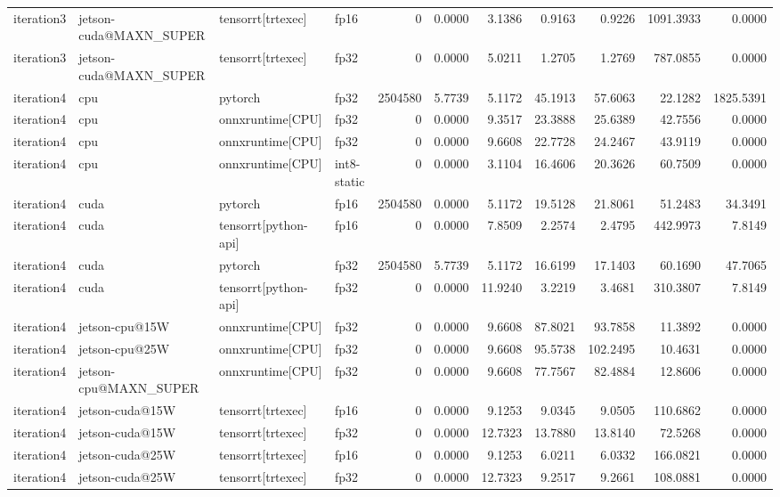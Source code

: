 \begin{table}
\begin{tabular}{llllrrrrrrr}
iteration3 & jetson-cuda@MAXN\_SUPER & tensorrt[trtexec] & fp16 & 0 & 0.0000 & 3.1386 & 0.9163 & 0.9226 & 1091.3933 & 0.0000 \\
iteration3 & jetson-cuda@MAXN\_SUPER & tensorrt[trtexec] & fp32 & 0 & 0.0000 & 5.0211 & 1.2705 & 1.2769 & 787.0855 & 0.0000 \\
iteration4 & cpu & pytorch & fp32 & 2504580 & 5.7739 & 5.1172 & 45.1913 & 57.6063 & 22.1282 & 1825.5391 \\
iteration4 & cpu & onnxruntime[CPU] & fp32 & 0 & 0.0000 & 9.3517 & 23.3888 & 25.6389 & 42.7556 & 0.0000 \\
iteration4 & cpu & onnxruntime[CPU] & fp32 & 0 & 0.0000 & 9.6608 & 22.7728 & 24.2467 & 43.9119 & 0.0000 \\
iteration4 & cpu & onnxruntime[CPU] & int8-static & 0 & 0.0000 & 3.1104 & 16.4606 & 20.3626 & 60.7509 & 0.0000 \\
iteration4 & cuda & pytorch & fp16 & 2504580 & 0.0000 & 5.1172 & 19.5128 & 21.8061 & 51.2483 & 34.3491 \\
iteration4 & cuda & tensorrt[python-api] & fp16 & 0 & 0.0000 & 7.8509 & 2.2574 & 2.4795 & 442.9973 & 7.8149 \\
iteration4 & cuda & pytorch & fp32 & 2504580 & 5.7739 & 5.1172 & 16.6199 & 17.1403 & 60.1690 & 47.7065 \\
iteration4 & cuda & tensorrt[python-api] & fp32 & 0 & 0.0000 & 11.9240 & 3.2219 & 3.4681 & 310.3807 & 7.8149 \\
iteration4 & jetson-cpu@15W & onnxruntime[CPU] & fp32 & 0 & 0.0000 & 9.6608 & 87.8021 & 93.7858 & 11.3892 & 0.0000 \\
iteration4 & jetson-cpu@25W & onnxruntime[CPU] & fp32 & 0 & 0.0000 & 9.6608 & 95.5738 & 102.2495 & 10.4631 & 0.0000 \\
iteration4 & jetson-cpu@MAXN\_SUPER & onnxruntime[CPU] & fp32 & 0 & 0.0000 & 9.6608 & 77.7567 & 82.4884 & 12.8606 & 0.0000 \\
iteration4 & jetson-cuda@15W & tensorrt[trtexec] & fp16 & 0 & 0.0000 & 9.1253 & 9.0345 & 9.0505 & 110.6862 & 0.0000 \\
iteration4 & jetson-cuda@15W & tensorrt[trtexec] & fp32 & 0 & 0.0000 & 12.7323 & 13.7880 & 13.8140 & 72.5268 & 0.0000 \\
iteration4 & jetson-cuda@25W & tensorrt[trtexec] & fp16 & 0 & 0.0000 & 9.1253 & 6.0211 & 6.0332 & 166.0821 & 0.0000 \\
iteration4 & jetson-cuda@25W & tensorrt[trtexec] & fp32 & 0 & 0.0000 & 12.7323 & 9.2517 & 9.2661 & 108.0881 & 0.0000 \\

\end{tabular}
\end{table}
